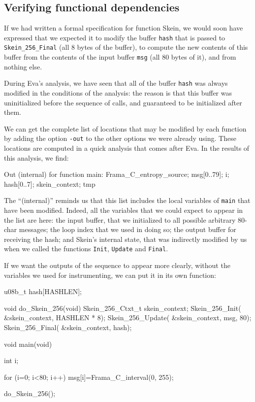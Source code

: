 \documentclass[web]{frama-c-book}
\newcommand{\Eva}{\textsf{Eva}}
\begin{document}
\subsection{Verifying functional dependencies}

If we had written a formal specification for function Skein, we would soon
have expressed that we expected it to modify the buffer \lstinline|hash|
that is passed to \lstinline|Skein_256_Final| (all 8 bytes of the buffer),
to compute the new contents of this buffer from the contents of the
input buffer \lstinline|msg| (all 80 bytes of it), and from nothing else.

During \Eva{}'s analysis, we have seen that all of the buffer \verb|hash|
was always modified in the conditions of the analysis: the reason is that
this buffer was uninitialized before the sequence of calls, 
and guaranteed to be initialized after them.

We can get the complete list of locations that may be modified by each
function by adding the option \verb|-out| to the other options we were 
already using. These locations are computed in a quick analysis that comes
after \Eva{}. In the results of this analysis, we find:
\begin{logs}
[inout] Out (internal) for function main:
          Frama_C_entropy_source; msg[0..79]; i; hash[0..7]; skein_context; tmp
\end{logs}
The ``(internal)'' reminds us that this list includes the local variables
of \lstinline|main| that have been modified. Indeed, all the variables
that we could expect to appear in the list are here: the input buffer, that
we initialized to all possible arbitrary 80-char messages; the loop index
that we used in doing so; the output buffer for receiving the hash;
and Skein's internal state, that was indirectly modified by us when we called
the functions \lstinline|Init|, \lstinline|Update| and \lstinline|Final|.

If we want the outputs of the sequence to appear more clearly, without the 
variables we used for instrumenting, we can put it in its own function:

\begin{listing}{1}
u08b_t hash[HASHLEN];

void do_Skein_256(void)
{
  Skein_256_Ctxt_t skein_context; 
  Skein_256_Init( &skein_context, HASHLEN * 8);
  Skein_256_Update( &skein_context, msg, 80);
  Skein_256_Final( &skein_context, hash);
}

void main(void)
{
  int i;

  for (i=0; i<80; i++) msg[i]=Frama_C_interval(0, 255);

  do_Skein_256();
}
\end{listing}
\end{document}
